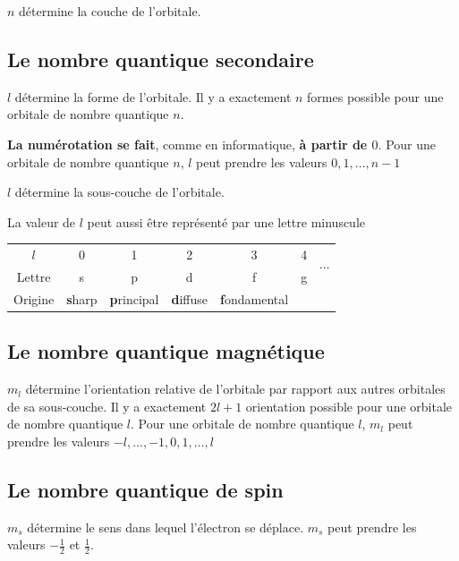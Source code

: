 \documentclass[11pt,a4paper,french]{article}
\begin{document}
$n$ détermine la couche de l'orbitale.

\subsection{Le nombre quantique secondaire}
$l$ détermine la forme de l'orbitale.
Il y a exactement $n$ formes possible pour une orbitale de nombre quantique $n$.

{\bf La numérotation se fait}, comme en informatique, {\bf à partir de $0$}.
Pour une orbitale de nombre quantique $n$, $l$ peut prendre les valeurs $0, 1, \ldots, n-1$

$l$ détermine la sous-couche de l'orbitale.

La valeur de $l$ peut aussi être représenté par une lettre minuscule

\begin{center}
	\begin{tabular}{c|cccccc}
		$l$ & 0 & 1 & 2 & 3 & 4 & \multirow{2}{*}{$\cdots$}\\
		\cline{1-6}
		Lettre & s & p & d & f & g\\
		Origine & {\bf s}harp & {\bf p}rincipal & {\bf d}iffuse & {\bf f}ondamental
	\end{tabular}
\end{center}

\subsection{Le nombre quantique magnétique}
$m_l$ détermine l'orientation relative de l'orbitale par rapport aux autres orbitales de sa sous-couche.
Il y a exactement $2l + 1$ orientation possible pour une orbitale de nombre quantique $l$.
Pour une orbitale de nombre quantique $l$, $m_l$ peut prendre les valeurs $-l, \ldots, -1,  0, 1, \ldots, l$

\subsection{Le nombre quantique de spin}
$m_s$ détermine le sens dans lequel l'électron se déplace.
$m_s$ peut prendre les valeurs $-\frac{1}{2}$ et $\frac{1}{2}$.
\end{document}
